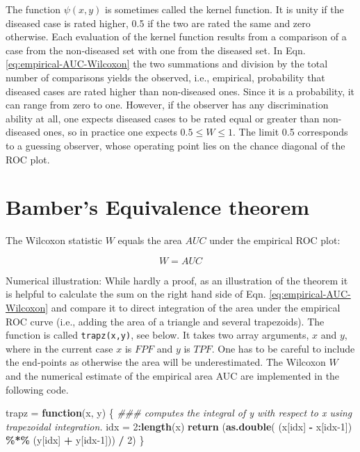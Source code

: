 \documentclass[
]{book}
\newenvironment{Shaded}{\begin{snugshade}}{\end{snugshade}}
\newcommand{\CommentTok}[1]{\textcolor[rgb]{0.56,0.35,0.01}{\textit{#1}}}
\newcommand{\ControlFlowTok}[1]{\textcolor[rgb]{0.13,0.29,0.53}{\textbf{#1}}}
\newcommand{\DecValTok}[1]{\textcolor[rgb]{0.00,0.00,0.81}{#1}}
\newcommand{\KeywordTok}[1]{\textcolor[rgb]{0.13,0.29,0.53}{\textbf{#1}}}
\newcommand{\NormalTok}[1]{#1}
\newcommand{\OperatorTok}[1]{\textcolor[rgb]{0.81,0.36,0.00}{\textbf{#1}}}
\newcommand{\StringTok}[1]{\textcolor[rgb]{0.31,0.60,0.02}{#1}}
\begin{document}
The function \(\psi\left ( x, y \right )\) is sometimes called the kernel function. It is unity if the diseased case is rated higher, 0.5 if the two are rated the same and zero otherwise. Each evaluation of the kernel function results from a comparison of a case from the non-diseased set with one from the diseased set. In Eqn. \eqref{eq:empirical-AUC-Wilcoxon} the two summations and division by the total number of comparisons yields the observed, i.e., empirical, probability that diseased cases are rated higher than non-diseased ones. Since it is a probability, it can range from zero to one. However, if the observer has any discrimination ability at all, one expects diseased cases to be rated equal or greater than non-diseased ones, so in practice one expects \(0.5 \leq W \leq 1\). The limit 0.5 corresponds to a guessing observer, whose operating point lies on the chance diagonal of the ROC plot.

\hypertarget{bambers-equivalence-theorem}{%
\section{Bamber's Equivalence theorem}\label{bambers-equivalence-theorem}}

The Wilcoxon statistic \(W\) equals the area \(AUC\) under the empirical ROC plot:

\begin{equation}
W = AUC
\label{eq:empirical-AUC-BambersTheorem}
\end{equation}

Numerical illustration: While hardly a proof, as an illustration of the theorem it is helpful to calculate the sum on the right hand side of Eqn. \eqref{eq:empirical-AUC-Wilcoxon} and compare it to direct integration of the area under the empirical ROC curve (i.e., adding the area of a triangle and several trapezoids). The function is called \texttt{trapz(x,y)}, see below. It takes two array arguments, \(x\) and \(y\), where in the current case \(x\) is \(FPF\) and \(y\) is \(TPF\). One has to be careful to include the end-points as otherwise the area will be underestimated. The Wilcoxon \(W\) and the numerical estimate of the empirical area AUC are implemented in the following code.

\begin{Shaded}
\begin{Highlighting}[]
\NormalTok{trapz =}\StringTok{ }\ControlFlowTok{function}\NormalTok{(x, y)}
\NormalTok{\{ }\CommentTok{\#\#\# computes the integral of y with respect to x using trapezoidal integration.}
\NormalTok{  idx =}\StringTok{ }\DecValTok{2}\OperatorTok{:}\KeywordTok{length}\NormalTok{(x)}
  \KeywordTok{return}\NormalTok{ (}\KeywordTok{as.double}\NormalTok{( (x[idx] }\OperatorTok{{-}}\StringTok{ }\NormalTok{x[idx}\DecValTok{{-}1}\NormalTok{]) }\OperatorTok{\%*\%}\StringTok{ }\NormalTok{(y[idx] }\OperatorTok{+}\StringTok{ }\NormalTok{y[idx}\DecValTok{{-}1}\NormalTok{])) }\OperatorTok{/}\StringTok{ }\DecValTok{2}\NormalTok{)}
\NormalTok{\}}
\end{Highlighting}
\end{Shaded}
\end{document}
